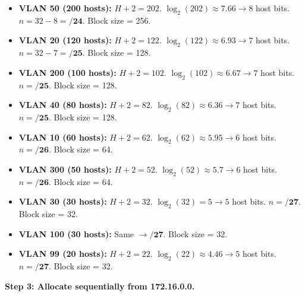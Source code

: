 \documentclass[11pt]{article}
\begin{document}
\begin{exoresolu}
\begin{itemize}
    \item \textbf{VLAN 50 (200 hosts):} $H+2=202$. $\log_2(202) \approx 7.66 \rightarrow 8$ host bits. $n = 32-8 = \mathbf{/24}$. Block size = 256.
    \item \textbf{VLAN 20 (120 hosts):} $H+2=122$. $\log_2(122) \approx 6.93 \rightarrow 7$ host bits. $n = 32-7 = \mathbf{/25}$. Block size = 128.
    \item \textbf{VLAN 200 (100 hosts):} $H+2=102$. $\log_2(102) \approx 6.67 \rightarrow 7$ host bits. $n = \mathbf{/25}$. Block size = 128.
    \item \textbf{VLAN 40 (80 hosts):} $H+2=82$. $\log_2(82) \approx 6.36 \rightarrow 7$ host bits. $n = \mathbf{/25}$. Block size = 128.
    \item \textbf{VLAN 10 (60 hosts):} $H+2=62$. $\log_2(62) \approx 5.95 \rightarrow 6$ host bits. $n = \mathbf{/26}$. Block size = 64.
    \item \textbf{VLAN 300 (50 hosts):} $H+2=52$. $\log_2(52) \approx 5.7 \rightarrow 6$ host bits. $n = \mathbf{/26}$. Block size = 64.
    \item \textbf{VLAN 30 (30 hosts):} $H+2=32$. $\log_2(32) = 5 \rightarrow 5$ host bits. $n = \mathbf{/27}$. Block size = 32.
    \item \textbf{VLAN 100 (30 hosts):} Same $\rightarrow \mathbf{/27}$. Block size = 32.
    \item \textbf{VLAN 99 (20 hosts):} $H+2=22$. $\log_2(22) \approx 4.46 \rightarrow 5$ host bits. $n = \mathbf{/27}$. Block size = 32.
\end{itemize}

\noindent\textbf{Step 3: Allocate sequentially from 172.16.0.0.}


\end{exoresolu}
\end{document}
